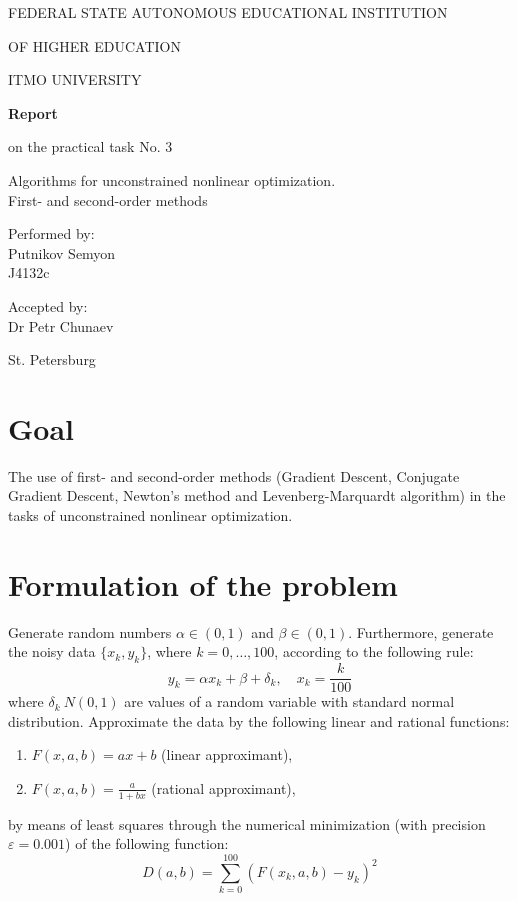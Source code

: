 \documentclass[a4paper,article,14pt]{extarticle}
\begin{document}
	\begin{titlepage}
		\begin{center}
			FEDERAL STATE AUTONOMOUS EDUCATIONAL INSTITUTION
			
			OF HIGHER EDUCATION
			
			ITMO UNIVERSITY
			\vspace{3cm}
			
			\large\textbf{Report}
			
			\large on the practical task No. 3
			
			\large \flqq Algorithms for unconstrained nonlinear optimization. \\  First- and second-order methods\frqq
			\vspace{5cm}
			

			\begin{flushright}
				{Performed by:} \\
				Putnikov Semyon \\ 
				J4132c \\
			\end{flushright}
			
			
			\begin{flushright}
				{Accepted by:} \\
				Dr Petr Chunaev \\ 
			\end{flushright}
			\vfill
			
			{St. Petersburg}
			\par{\number\year}
		\end{center}
	\end{titlepage}

	\newpage
	
	\section{Goal}
	The use of first- and second-order methods (Gradient Descent, Conjugate Gradient Descent, Newton’s method and Levenberg-Marquardt algorithm) in the tasks of unconstrained nonlinear optimization.
	
	\section{Formulation of the problem}
	Generate random numbers $\alpha \in (0,1)$ and $\beta \in (0,1)$. Furthermore, generate the noisy data $\{x_k,y_k\}$, where $k = 0, \dotso, 100$, according to the following rule:
	$$y_k = \alpha x_k + \beta + \delta_k, \quad x_k = \frac{k}{100}$$
	where $\delta_k\: N(0,1)$ are values of a random variable with standard normal distribution. Approximate the data by the following linear and rational functions:
	\begin{enumerate}[label=(\arabic*)]
		\item $F(x,a,b) = ax + b$ \quad (linear approximant),
		\item $F(x,a,b) = \frac{a}{1+bx}$ \quad (rational approximant),
	\end{enumerate}
	by means of least squares through the numerical minimization (with precision $\varepsilon = 0.001$) of the following function: $$D(a,b) = \sum\limits_{k=0}^{100} (F(x_k,a,b)-y_k)^2$$
		
\end{document}
